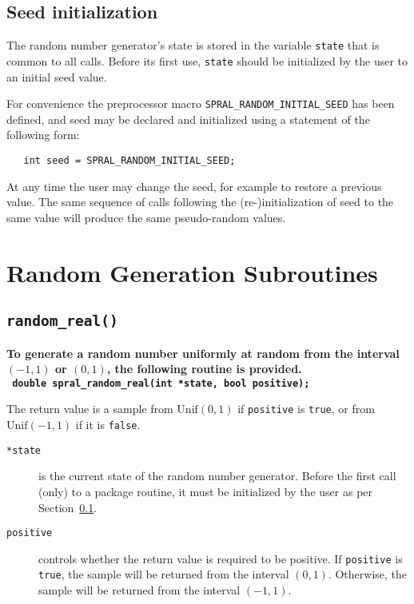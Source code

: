 \subsection{Seed initialization}
\label{random: seed initialization}
The random number generator's state is stored in the variable {\tt state} that
is common to all calls. Before its first use, {\tt state} should be initialized
by the user to an initial seed value.

For convenience the preprocessor macro \texttt{SPRAL\_RANDOM\_INITIAL\_SEED} has
been defined, and seed may be declared and initialized using a statement of the
following form:
\begin{verbatim}
   int seed = SPRAL_RANDOM_INITIAL_SEED;
\end{verbatim}

At any time the user may change the seed, for example to restore a previous
value. The same sequence of calls following the (re-)initialization of seed to
the same value will produce the same pseudo-random values.


\section{Random Generation Subroutines}


\subsection{\texttt{random\_real()}}

\textbf{\noindent
   To generate a random number uniformly at random from the interval $(-1,1)$ or $(0,1)$, the following routine is provided.
   \vspace*{0.1cm} \\
   \texttt{ \hspace*{0.2cm}
      double spral\_random\_real(int *state, bool positive);
   }
   \vspace{0.3cm}
}

\noindent
The return value is a sample from $\mathrm{Unif}(0,1)$ if {\tt positive} is
{\tt true}, or from $\mathrm{Unif}(-1,1)$ if it is {\tt false}.

\begin{description}

\item[\texttt{*state}] is the current state of the random number generator.
   Before the first call (only) to a package routine, it must be initialized by
   the user as per Section~\ref{random: seed initialization}.

\item[\texttt{positive}] controls whether the return value is required to be
   positive. If \texttt{positive} is \texttt{true}, the sample will be returned
   from the interval $(0,1)$. Otherwise, the sample will be returned from the
   interval $(-1,1)$.

\end{description}

